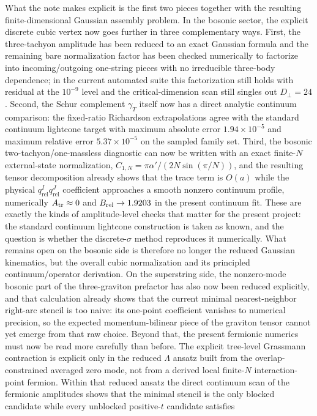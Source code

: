 \documentclass[11pt]{article}
\numberwithin{equation}{section}
\begin{document}
What the note makes explicit is the first two pieces together with the resulting finite-dimensional Gaussian assembly problem. In the bosonic sector, the explicit discrete cubic vertex now goes further in three complementary ways. First, the three-tachyon amplitude has been reduced to an exact Gaussian formula and the remaining bare normalization factor has been checked numerically to factorize into incoming/outgoing one-string pieces with no irreducible three-body dependence; in the current automated suite this factorization still holds with residual at the $10^{-9}$ level and the critical-dimension scan still singles out $D_\perp=24$. Second, the Schur complement $\gamma_T$ itself now has a direct analytic continuum comparison: the fixed-ratio Richardson extrapolations agree with the standard continuum lightcone target with maximum absolute error $1.94\times10^{-5}$ and maximum relative error $5.37\times10^{-5}$ on the sampled family set. Third, the bosonic two-tachyon/one-massless diagnostic can now be written with an exact finite-$N$ external-state normalization, $C_{1,N}=\pi\alpha'/(2N\sin(\pi/N))$, and the resulting tensor decomposition already shows that the trace term is $O(a)$ while the physical $q_{\mathrm{rel}}^I q_{\mathrm{rel}}^J$ coefficient approaches a smooth nonzero continuum profile, numerically $A_{\rm tr}\approx 0$ and $B_{\rm rel}\to 1.9203$ in the present continuum fit. These are exactly the kinds of amplitude-level checks that matter for the present project: the standard continuum lightcone construction is taken as known, and the question is whether the discrete-$\sigma$ method reproduces it numerically. What remains open on the bosonic side is therefore no longer the reduced Gaussian kinematics, but the overall cubic normalization and its principled continuum/operator derivation. On the superstring side, the nonzero-mode bosonic part of the three-graviton prefactor has also now been reduced explicitly, and that calculation already shows that the current minimal nearest-neighbor right-arc stencil is too naive: its one-point coefficient vanishes to numerical precision, so the expected momentum-bilinear piece of the graviton tensor cannot yet emerge from that raw choice. Beyond that, the present fermionic numerics must now be read more carefully than before. The explicit tree-level Grassmann contraction is explicit only in the reduced $\Lambda$ ansatz built from the overlap-constrained averaged zero mode, not from a derived local finite-$N$ interaction-point fermion. Within that reduced ansatz the direct continuum scan of the fermionic amplitudes shows that the minimal stencil is the only blocked candidate while every unblocked positive-$t$ candidate satisfies
\end{document}
